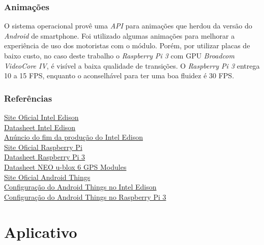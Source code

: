 \documentclass[
	12pt,				%
	oneside,			%
	a4paper,			%
	brazil				%
]{abntex2}
\begin{document}
\subsubsection{Animações}

O sistema operacional provê uma \textit{API} para animações que herdou da versão do \textit{Android} de smartphone. Foi utilizado algumas animações para melhorar a experiência de uso dos motoristas com o módulo. Porém, por utilizar placas de baixo custo, no caso deste trabalho o \textit{Raspberry Pi 3} com GPU \textit{Broadcom VideoCore IV}, é visível a baixa qualidade de transições.
O \textit{Raspberry Pi 3} entrega 10 a 15 FPS, enquanto o aconselhável para ter uma boa fluidez é 30 FPS.

\subsubsection{Referências}

\href{https://software.intel.com/en-us/iot/hardware/edison}{Site Oficial Intel Edison}\\
\href{http://download.intel.com/support/edison/sb/edisonmodule_hg_331189004.pdf}{Datasheet Intel Edison}\\
\href{https://www.embarcados.com.br/placas-intel-edison-galileo-e-joule-serao-descontinuadas/}{Anúncio do fim da produção do Intel Edison}\\
\href{https://www.raspberrypi.org/products/raspberry-pi-3-model-b/}{Site Oficial Raspberry Pi}\\
\href{https://www.raspberrypi.org/documentation/hardware/computemodule/RPI-CM-DATASHEET-V1_0.pdf}{Datasheet Raspberry Pi 3}\\
\href{https://www.u-blox.com/sites/default/files/products/documents/NEO-6_DataSheet_(GPS.G6-HW-09005).pdf}{Datasheet NEO u-blox 6 GPS Modules}\\
\href{https://developer.android.com/things/index.html}{Site Oficial Android Things}\\
\href{https://developer.android.com/things/hardware/edison.html}{Configuração do Android Things no Intel Edison}\\
\href{https://developer.android.com/things/hardware/raspberrypi.html}{Configuração do Android Things no Raspberry Pi 3}\\

\newpage

\section{Aplicativo}
\end{document}
